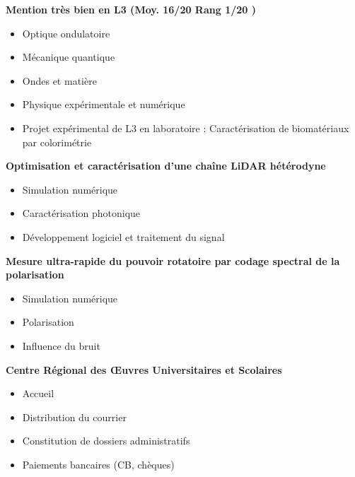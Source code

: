 \documentclass[9pt,a4paper,academicons]{altacv}
\begin{document}
\textbf{Mention très bien en L3 (Moy. 16/20 Rang 1/20 )}
\small{
\begin{itemize}
\item Optique ondulatoire
\item Mécanique quantique
\item Ondes et matière
\item Physique expérimentale et numérique
\item Projet expérimental de L3 en laboratoire : Caractérisation de biomatériaux par colorimétrie
\end{itemize}
}




\textbf{Optimisation et caractérisation d'une chaîne LiDAR hétérodyne}
\small{
\begin{itemize}
\item Simulation numérique
\item Caractérisation photonique
\item Développement logiciel et traitement du signal
\end{itemize}
}

\divider


\textbf{Mesure ultra-rapide du pouvoir rotatoire par codage spectral de la
polarisation}
\small{
\begin{itemize}
\item Simulation numérique
\item Polarisation
\item Influence du bruit
\end{itemize}
}

\divider

\textbf{Centre Régional des Œuvres Universitaires et Scolaires}
\small{
\begin{itemize}
\item Accueil
\item Distribution du courrier
\item Constitution de dossiers administratifs
\item Paiements bancaires (CB, chèques)
\end{itemize}
}
\end{document}

